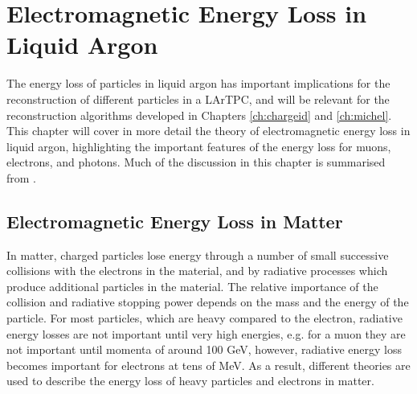 \chapter{\label{ch:energyloss}Electromagnetic Energy Loss in Liquid Argon} 

% 

\minitoc

The energy loss of particles in liquid argon has important implications for the
reconstruction of different particles in a LArTPC, and will be relevant for the
reconstruction algorithms developed in Chapters \ref{ch:chargeid} and 
\ref{ch:michel}. This chapter will cover in more detail the theory of 
electromagnetic energy loss in liquid argon, highlighting the important 
features of the energy loss for muons, electrons, and photons. Much of the
discussion in this chapter is summarised from \cite{PhysRevD.98.030001}.

\section{Electromagnetic Energy Loss in Matter}
In matter, charged particles lose energy through a number of small successive
collisions with the electrons in the material, and by radiative processes which
produce additional particles in the material. The relative importance of the
collision and radiative stopping power depends on the mass and the energy of the
particle. For most particles, which are heavy compared to the electron, 
radiative energy losses are not important until very high energies, e.g. for a 
muon they are not important until momenta of around 100 GeV, however, radiative 
energy loss becomes important for electrons at tens of 
MeV\cite{PhysRevD.98.030001}. As a result, different theories are used to 
describe the energy loss of heavy particles and electrons in matter.


